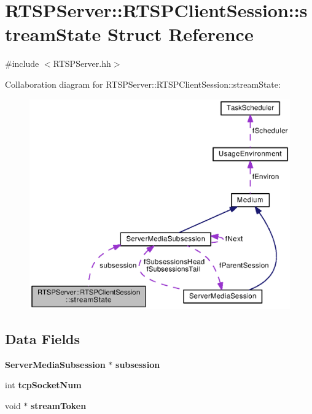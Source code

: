 \section{R\+T\+S\+P\+Server\+:\+:R\+T\+S\+P\+Client\+Session\+:\+:stream\+State Struct Reference}
\label{structRTSPServer_1_1RTSPClientSession_1_1streamState}


{\ttfamily \#include $<$R\+T\+S\+P\+Server.\+hh$>$}



Collaboration diagram for R\+T\+S\+P\+Server\+:\+:R\+T\+S\+P\+Client\+Session\+:\+:stream\+State\+:
\nopagebreak
\begin{figure}[H]
\begin{center}
\leavevmode
\includegraphics[width=350pt]{structRTSPServer_1_1RTSPClientSession_1_1streamState__coll__graph}
\end{center}
\end{figure}
\subsection*{Data Fields}
\begin{DoxyCompactItemize}
\item 
{\bf Server\+Media\+Subsession} $\ast$ {\bf subsession}
\item 
int {\bf tcp\+Socket\+Num}
\item 
void $\ast$ {\bf stream\+Token}
\end{DoxyCompactItemize}



